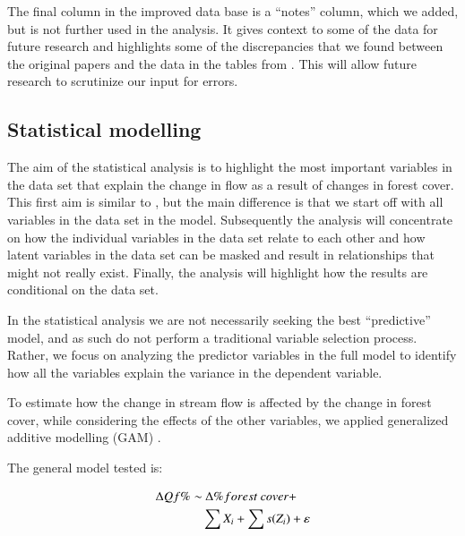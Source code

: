 \documentclass[]{elsarticle} %
\begin{document}
The final column in the improved data base is a ``notes'' column, which we added, but is not further used in the analysis. It gives context to some of the data for future research and highlights some of the discrepancies that we found between the original papers and the data in the tables from \citet{zhang2017}. This will allow future research to scrutinize our input for errors.

\hypertarget{statistical-modelling}{%
\subsection{Statistical modelling}\label{statistical-modelling}}

The aim of the statistical analysis is to highlight the most important variables in the data set that explain the change in flow as a result of changes in forest cover. This first aim is similar to \citet{zhang2017}, but the main difference is that we start off with all variables in the data set in the model. Subsequently the analysis will concentrate on how the individual variables in the data set relate to each other and how latent variables in the data set can be masked and result in relationships that might not really exist. Finally, the analysis will highlight how the results are conditional on the data set.

In the statistical analysis we are not necessarily seeking the best ``predictive'' model, and as such do not perform a traditional variable selection process. Rather, we focus on analyzing the predictor variables in the full model to identify how all the variables explain the variance in the dependent variable.

To estimate how the change in stream flow is affected by the change in forest cover, while considering the effects of the other variables, we applied generalized additive modelling (GAM) \citep{wood2006}.

The general model tested is:

\begin{align}
\Delta Qf \% \sim &~ \Delta \% forest~cover + \notag \\ 
& \sum{X_i} + \sum{s(Z_i)} + \varepsilon \label{eq:eq2}
\end{align}
\end{document}
